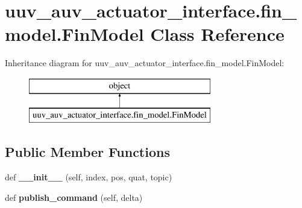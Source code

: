 \hypertarget{classuuv__auv__actuator__interface_1_1fin__model_1_1FinModel}{}\section{uuv\+\_\+auv\+\_\+actuator\+\_\+interface.\+fin\+\_\+model.\+Fin\+Model Class Reference}
\label{classuuv__auv__actuator__interface_1_1fin__model_1_1FinModel}
Inheritance diagram for uuv\+\_\+auv\+\_\+actuator\+\_\+interface.\+fin\+\_\+model.\+Fin\+Model\+:\begin{figure}[H]
\begin{center}
\leavevmode
\includegraphics[height=2.000000cm]{classuuv__auv__actuator__interface_1_1fin__model_1_1FinModel}
\end{center}
\end{figure}
\subsection*{Public Member Functions}
\begin{DoxyCompactItemize}
\item 
\mbox{\label{classuuv__auv__actuator__interface_1_1fin__model_1_1FinModel_a00749152250af4a7a5619d1184510267}} 
def {\bfseries \+\_\+\+\_\+init\+\_\+\+\_\+} (self, index, pos, quat, topic)
\item 
\mbox{\label{classuuv__auv__actuator__interface_1_1fin__model_1_1FinModel_a406855fc9e43497eabbf022e848d202b}} 
def {\bfseries publish\+\_\+command} (self, delta)
\end{DoxyCompactItemize}
